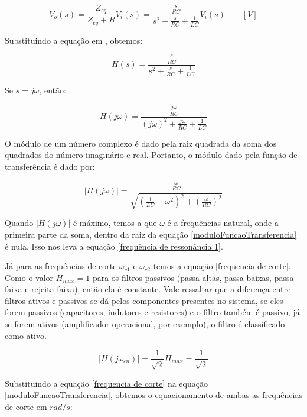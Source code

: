 \begin {equation}
V_o (s) = \frac{Z_{eq}}{Z_{eq} + R} V_i(s) = \frac{\frac{s}{RC}}{ s^2 + \frac{s}{RC} + \frac{1}{LC} } V_i(s) \qquad [V]
\label{V0 passa-faixa}
\end {equation}

Substituindo a equação  em , obtemos:

\begin {equation}
H(s) = \frac{ \frac{s}{RC} }{ s^2 + \frac{s}{RC} + \frac{1}{LC} }
\end {equation}

Se $s=j\omega$, então:

\begin {equation}
H(j \omega) = \frac{\frac{j \omega}{RC}}{ (j \omega)^2 + \frac{j \omega}{RC} + \frac{1}{LC} }
\end {equation}

O módulo de um número complexo é dado pela raiz quadrada da soma dos quadrados do número imaginário e real. Portanto, o módulo dado pela função de transferência é dado por:

\begin {equation}
|H(j \omega)| = \frac{ \frac{\omega}{RC} }{ \sqrt{  ( \frac{ 1 }{LC} - \omega^2 )^2 + (\frac{\omega}{RC})^2} }
\label{moduloFuncaoTransferencia}
\end {equation}

Quando $|H(j \omega)|$ é máximo, temos a que $\omega$ é a frequências natural, onde a primeira parte da soma, dentro da raiz da equação \ref{moduloFuncaoTransferencia} é nula. Isso nos leva a equação \ref{frequência de ressonância 1}.

Já para as frequências de corte $\omega_{c1}$ e $\omega_{c2}$ temos a equação \ref{frequencia de corte}. Como o valor $H_{max} = 1$ para os filtros passivos (passa-altas, passa-baixas, passa-faixa e rejeita-faixa), então ela é constante. Vale ressaltar que a diferença entre filtros ativos e passivos se dá pelos componentes presentes no sistema, se eles forem passivos (capacitores, indutores e resistores) e o filtro também é passivo, já se forem ativos (amplificador
operacional, por exemplo), o filtro é classificado como ativo.

\begin{equation}
	|H(j \omega_{cn})| = \frac{1}{\sqrt{2}} H_{max} = \frac{1}{\sqrt{2}}
	\label{frequencia de corte}
\end{equation}

Substituindo a equação \ref{frequencia de corte} na equação \ref{moduloFuncaoTransferencia}, obtemos o equacionamento de ambas as frequências de corte em $rad/s$:

